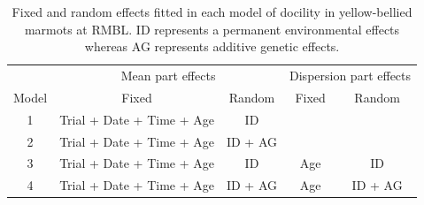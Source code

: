 \documentclass[a4paper,12pt,twoside]{article}
\begin{document}
	\begin{table}[h!]
		\caption{Fixed and random effects fitted in each model of docility in yellow-bellied marmots at RMBL. 
			ID represents a permanent environmental effects whereas AG represents additive genetic effects.}
		\label{Tab:modelsnoyr}
		\centering
		\begin{tabular}{c c c c c}
			\hline
			\multicolumn{1}{c}{} &
			\multicolumn{2}{c}{Mean part effects} &
			\multicolumn{2}{c}{Dispersion part effects}\\ 
			Model & Fixed & Random & Fixed & Random \\
			\hline
			1 & Trial + Date + Time + Age & ID & & \\
			2 & Trial + Date + Time + Age & ID + AG & & \\
			3 & Trial + Date + Time + Age & ID & Age & ID \\
			4 & Trial + Date + Time + Age & ID + AG & Age & ID + AG\\
			\hline
		\end{tabular}
	\end{table}
	
\end{document}
